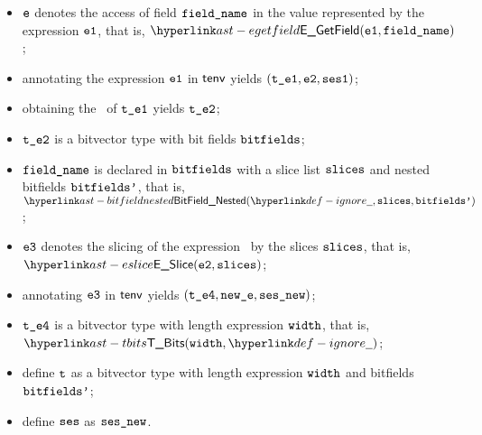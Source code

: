 \ProseParagraph
\AllApply
\begin{itemize}
  \item $\ve$ denotes the access of field $\fieldname$ in the value represented by the expression $\veone$, that is, $\EGetField(\veone, \fieldname)$;
  \item annotating the expression $\veone$ in $\tenv$ yields $(\vteone, \vetwo, \vsesone)$\ProseOrTypeError;
  \item obtaining the \underlyingtype\ of $\vteone$ yields $\vtetwo$\ProseOrTypeError;
  \item $\vtetwo$ is a bitvector type with bit fields $\bitfields$;
  \item $\fieldname$ is declared in $\bitfields$ with a slice list $\slices$ and nested bitfields $\bitfieldsp$, that is,
        $\BitFieldNested(\Ignore, \slices, \bitfieldsp)$;
  \item $\vethree$ denotes the slicing of the expression \vetwo\ by the slices $\slices$, that is, \\ $\ESlice(\vetwo, \slices)$;
  \item annotating $\vethree$ in $\tenv$ yields $(\vtefour, \newe, \vsesnew)$\ProseOrTypeError;
  \item $\vtefour$ is a bitvector type with length expression $\width$, that is, $\TBits(\width, \Ignore)$;
  \item define $\vt$ as a bitvector type with length expression $\width$ and bitfields $\bitfieldsp$;
  \item define $\vses$ as $\vsesnew$.
\end{itemize}
\FormallyParagraph
\begin{mathpar}
\end{mathpar}

